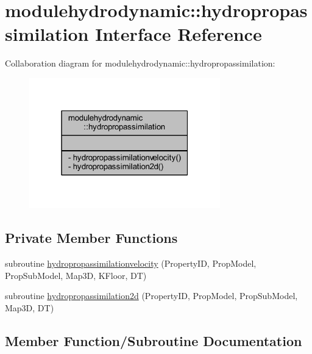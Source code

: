 \hypertarget{interfacemodulehydrodynamic_1_1hydropropassimilation}{}\section{modulehydrodynamic\+:\+:hydropropassimilation Interface Reference}
\label{interfacemodulehydrodynamic_1_1hydropropassimilation}


Collaboration diagram for modulehydrodynamic\+:\+:hydropropassimilation\+:\nopagebreak
\begin{figure}[H]
\begin{center}
\leavevmode
\includegraphics[width=235pt]{interfacemodulehydrodynamic_1_1hydropropassimilation__coll__graph}
\end{center}
\end{figure}
\subsection*{Private Member Functions}
\begin{DoxyCompactItemize}
\item 
subroutine \mbox{\hyperlink{interfacemodulehydrodynamic_1_1hydropropassimilation_a230e25209a23ea84a69cc47251354a82}{hydropropassimilationvelocity}} (Property\+ID, Prop\+Model, Prop\+Sub\+Model, Map3D, K\+Floor, DT)
\item 
subroutine \mbox{\hyperlink{interfacemodulehydrodynamic_1_1hydropropassimilation_a206a72908025c6d93713c5b6c91d0441}{hydropropassimilation2d}} (Property\+ID, Prop\+Model, Prop\+Sub\+Model, Map3D, DT)
\end{DoxyCompactItemize}


\subsection{Member Function/\+Subroutine Documentation}
\mbox{\label{interfacemodulehydrodynamic_1_1hydropropassimilation_a206a72908025c6d93713c5b6c91d0441}} 
